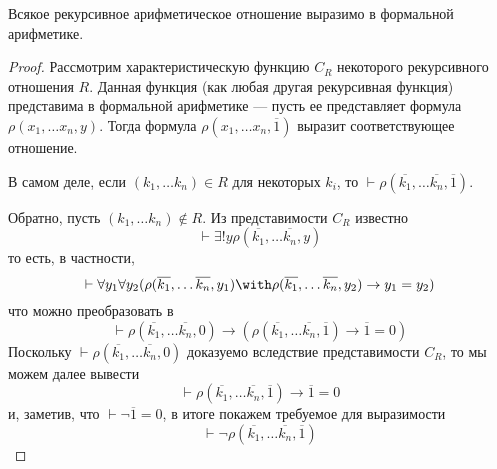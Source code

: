 \begin{theorem}Всякое рекурсивное арифметическое отношение выразимо в формальной арифметике.\end{theorem}
\begin{proof}Рассмотрим характеристическую функцию $C_R$ некоторого рекурсивного отношения $R$. Данная функция 
(как любая другая рекурсивная функция) представима в формальной арифметике --- пусть
ее представляет формула $\rho(x_1, \dots x_n, y)$. Тогда 
формула $\rho (x_1, \dots x_n, \overline{1})$ выразит соответствующее отношение.

В самом деле, если $(k_1,\dots k_n) \in R$ для некоторых $k_i$, то
$\vdash \rho(\overline{k_1}, \dots \overline{k_n}, \overline{1})$.

Обратно, пусть $(k_1,\dots k_n) \notin R$. Из представимости $C_R$ известно
$$\vdash \exists ! y\rho(\overline{k_1}, \dots \overline{k_n}, y)$$
то есть, в частности,
$$\vdash \forall y_1 \forall y_2 (\rho(\overline{k_1}, \dots \overline{k_n}, y_1) \with \rho(\overline{k_1}, \dots \overline{k_n}, y_2) \rightarrow y_1 = y_2)$$
что можно преобразовать в
$$\vdash \rho(\overline{k_1}, \dots \overline{k_n}, 0) \rightarrow (\rho(\overline{k_1}, \dots \overline{k_n}, \overline{1}) \rightarrow \overline{1} = 0)$$
Поскольку $\vdash \rho(\overline{k_1}, \dots \overline{k_n}, 0)$ доказуемо вследствие представимости $C_R$,
то мы можем далее вывести
$$\vdash \rho(\overline{k_1}, \dots \overline{k_n}, \overline{1}) \rightarrow \overline{1} = 0$$
и, заметив, что $\vdash\neg \overline{1} = 0$, в итоге покажем требуемое для выразимости
$$\vdash \neg\rho(\overline{k_1}, \dots \overline{k_n}, \overline{1})$$
\end{proof}
